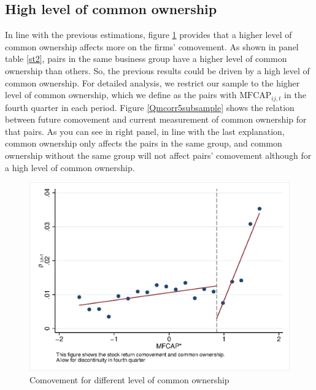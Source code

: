 		
		
		
		
		\subsection{{High level of common ownership}}
		
			In line with the previous estimations, figure \ref{Qmcorr5lrd} provides that a higher level of common ownership affects more on the firms' comovement. As shown in panel   table \ref{st2}, pairs in the same business group have a higher level of common ownership than others. So, the previous results could be driven by a high level of common ownership. For detailed analysis, we restrict our sample to the higher level of common ownership, which we define as the pairs with $\text{MFCAP}_{ij,t}$ in the fourth quarter in each period. Figure \ref{Qmcorr5subsample} shows the relation between future comovement and current measurement of common ownership for that pairs. As you can see in right panel, in line with the last explanation, common ownership only affects the pairs in the same group, and common ownership without the same group will not affect pairs' comovement although for a high level of common ownership.
			
			\begin{figure}[htbp]
				\centering  
				\includegraphics[width=0.65\linewidth]{"Output/Qmcorr5lrd.eps"}
				\caption{ Comovement for different level of common ownership}
				\label{Qmcorr5lrd}
			\end{figure}
			
